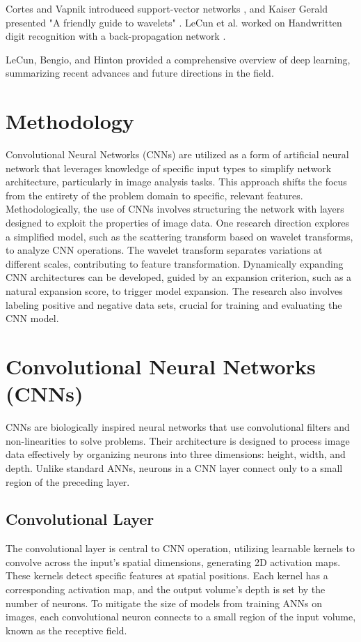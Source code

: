 \documentclass{article}
\begin{document}
Cortes and Vapnik introduced support-vector networks \cite{24}, and Kaiser Gerald presented "A friendly guide to wavelets" \cite{26}. LeCun et al. worked on Handwritten digit recognition with a back-propagation network \cite{27}.

LeCun, Bengio, and Hinton \cite{30} provided a comprehensive overview of deep learning, summarizing recent advances and future directions in the field.


\section*{Methodology}
Convolutional Neural Networks (CNNs) are utilized as a form of artificial neural network that leverages knowledge of specific input types to simplify network architecture, particularly in image analysis tasks. This approach shifts the focus from the entirety of the problem domain to specific, relevant features. Methodologically, the use of CNNs involves structuring the network with layers designed to exploit the properties of image data. One research direction explores a simplified model, such as the scattering transform based on wavelet transforms, to analyze CNN operations. The wavelet transform separates variations at different scales, contributing to feature transformation. Dynamically expanding CNN architectures can be developed, guided by an expansion criterion, such as a natural expansion score, to trigger model expansion. The research also involves labeling positive and negative data sets, crucial for training and evaluating the CNN model.


\section*{Convolutional Neural Networks (CNNs)}
CNNs are biologically inspired neural networks that use convolutional filters and non-linearities to solve problems. Their architecture is designed to process image data effectively by organizing neurons into three dimensions: height, width, and depth. Unlike standard ANNs, neurons in a CNN layer connect only to a small region of the preceding layer.

\subsection*{Convolutional Layer}
The convolutional layer is central to CNN operation, utilizing learnable kernels to convolve across the input's spatial dimensions, generating 2D activation maps. These kernels detect specific features at spatial positions. Each kernel has a corresponding activation map, and the output volume's depth is set by the number of neurons. To mitigate the size of models from training ANNs on images, each convolutional neuron connects to a small region of the input volume, known as the receptive field.
\end{document}
